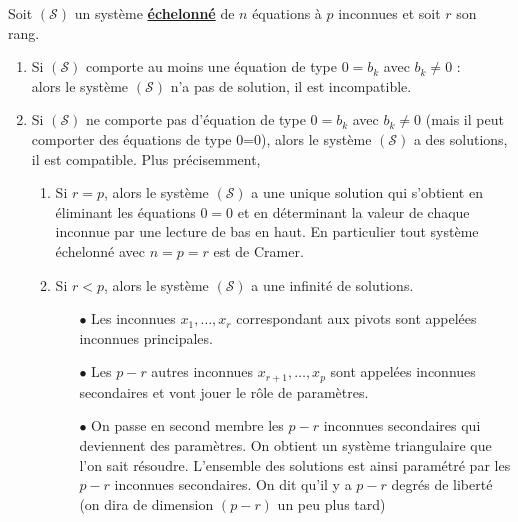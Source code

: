 \documentclass[a4paper, 11pt]{article}
\begin{document}

\vspace{0.2cm}

{\noindent  

\begin{prop} 
Soit $(\mathcal{S})$ un syst\`eme \textbf{\underline{\'echelonn\'e}} de $n$ \'equations \`a $p$ inconnues et soit $r$ son rang.
\begin{enumerate}
 \item 
Si $(\mathcal{S})$ comporte au moins une \'equation de type $0=b_k$ avec $b_k\not= 0$ : \dotfill\\
 alors le syst\`eme $(\mathcal{S})$ n'a pas de solution, il est incompatible.
\vsec\dotfill
\item 
Si $(\mathcal{S})$ ne comporte pas d'\'equation de type $0=b_k$ avec $b_k\not= 0$ (mais il peut comporter des \'equations de type 0=0), alors le syst\`eme $(\mathcal{S})$ a des solutions, il est compatible. Plus pr\'ecisemment,
\begin{enumerate}
\item 
Si {$r=p$}, alors le syst\`eme $(\mathcal{S})$ a une unique solution qui s'obtient en \'eliminant les \'equations $0=0$ et en d\'eterminant la valeur de chaque inconnue par une lecture de bas en haut. En particulier tout syst\`eme \'echelonn\'e avec $n=p=r$ est de Cramer.
\item 
Si {$r<p$}, alors le syst\`eme $(\mathcal{S})$ a une  infinité de solutions.
\begin{itemize}
 \item[$\bullet$]
Les inconnues $x_1,\dots,x_r$ correspondant aux pivots sont appel\'ees inconnues principales. 
\item[$\bullet$]  
Les $p-r$ autres inconnues $x_{r+1},\dots, x_p$ sont appel\'ees inconnues secondaires et vont jouer le r\^ole de param\`etres.
\item[$\bullet$]  
On passe en second membre les $p-r$ inconnues secondaires qui deviennent des param\`etres. On obtient un syst\`eme triangulaire que l'on sait r\'esoudre. L'ensemble des solutions est ainsi param\'etr\'e par les $p-r$ inconnues secondaires. On dit qu'il y a $p-r$ degrés de liberté (on dira de dimension $(p-r)$ un peu plus tard) 
\end{itemize}
\end{enumerate}
\end{enumerate}
\end{prop}

}
\end{document}
